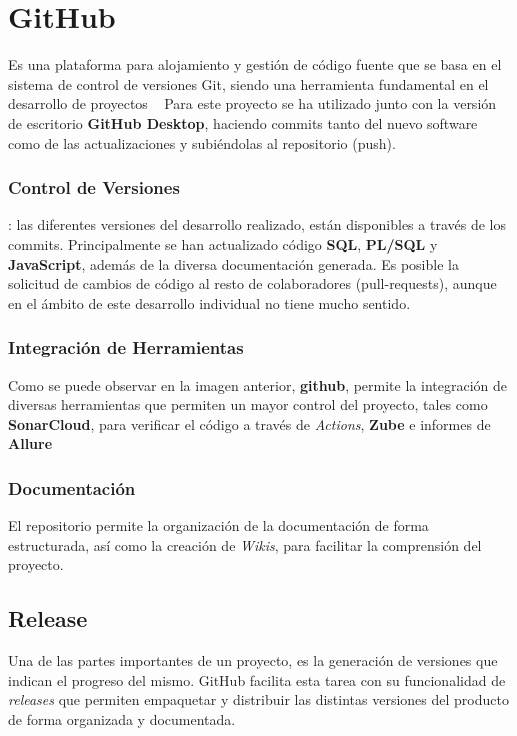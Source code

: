 \section{GitHub}
Es una plataforma para alojamiento y gestión de código fuente que se basa en el sistema de control de versiones Git, siendo una herramienta fundamental en el desarrollo de proyectos ~\cite{ChaconProGitTodo}
Para este proyecto se ha utilizado junto con la versión de escritorio \textbf{GitHub Desktop}, haciendo commits tanto del nuevo software como de las actualizaciones y subiéndolas al repositorio (push).
\subsubsection{Control de Versiones}:
las diferentes versiones del desarrollo realizado, están disponibles a través de los commits. Principalmente se han actualizado código \textbf{SQL}, \textbf{PL/SQL} y \textbf{JavaScript}, además de la diversa documentación generada. 
Es posible la solicitud de cambios de código al resto de colaboradores (pull-requests), aunque en el ámbito de este desarrollo individual no tiene mucho sentido.
\subsubsection{Integración de Herramientas}
Como se puede observar en la imagen anterior, \textbf{github}, permite la integración de diversas herramientas que permiten un mayor control del proyecto, tales como \textbf{SonarCloud}, para verificar el código a través de \textit{Actions}, \textbf{Zube} e informes de \textbf{Allure}
\subsubsection{Documentación}
El repositorio permite la organización de la documentación de forma estructurada, así como la creación de \textit{Wikis}, para facilitar la comprensión del proyecto.
\subsection{\gls{Release}}
Una de las partes importantes de un proyecto, es la generación de versiones que indican el progreso del mismo. GitHub facilita esta tarea con su funcionalidad de \textit{releases} que permiten empaquetar y distribuir las distintas versiones del producto de forma organizada y documentada.

